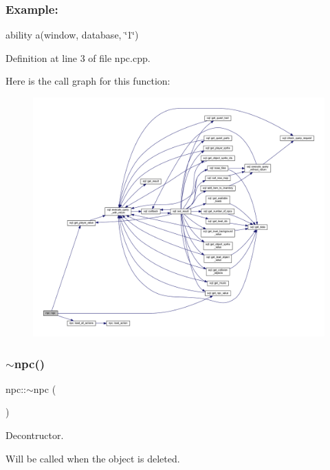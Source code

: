 \subsubsection*{Example\+: }

ability a(window, database, \char`\"{}1\char`\"{})~\newline


Definition at line 3 of file npc.\+cpp.

Here is the call graph for this function\+:
\nopagebreak
\begin{figure}[H]
\begin{center}
\leavevmode
\includegraphics[width=350pt]{classnpc_ac99eae829579a6f49387bd44129ec33a_cgraph}
\end{center}
\end{figure}
\mbox{\label{classnpc_a77e7e3430ee5ff383f7a16b4b3e07fa1}} 
\subsubsection{\texorpdfstring{$\sim$npc()}{~npc()}}
{\footnotesize\ttfamily npc\+::$\sim$npc (\begin{DoxyParamCaption}{ }\end{DoxyParamCaption})}



Decontructor. 

Will be called when the object is deleted. ~\newline


